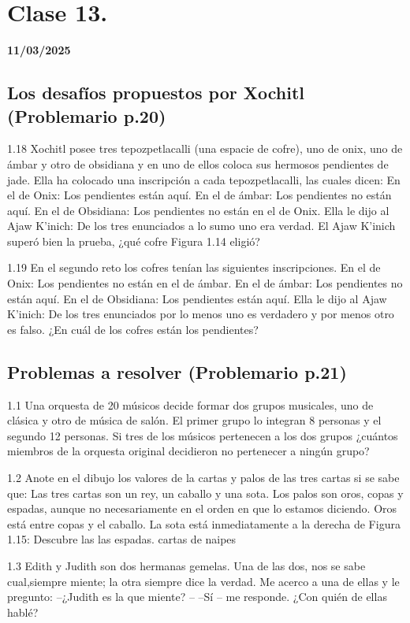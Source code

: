 \section{Clase 13.}
\textbf{11/03/2025}

\subsection{Los desafíos propuestos por Xochitl (Problemario p.20)}

1.18 Xochitl posee tres tepozpetlacalli (una espacie de cofre), uno de onix, uno de ámbar y otro de obsidiana y en uno de ellos coloca sus hermosos pendientes de jade. Ella ha colocado una inscripción a cada tepozpetlacalli, las cuales dicen: En el de Onix: Los pendientes están aquí. En el de ámbar: Los pendientes no están aquí. En el de Obsidiana: Los pendientes no están en el de Onix. Ella le dijo al Ajaw K’inich: De los tres enunciados a lo sumo uno era verdad. El Ajaw K’inich superó bien la prueba, ¿qué cofre Figura 1.14 eligió?

1.19 En el segundo reto los cofres tenían las siguientes inscripciones. En el de Onix: Los pendientes no están en el de ámbar. En el de ámbar: Los pendientes no están aquí. En el de Obsidiana: Los pendientes están aquí. Ella le dijo al Ajaw K’inich: De los tres enunciados por lo menos uno es verdadero y por menos otro es falso. ¿En cuál de los cofres están los pendientes?

\subsection{Problemas a resolver (Problemario p.21)}
1.1 Una orquesta de 20 músicos decide formar dos grupos musicales, uno de clásica y otro de música de salón. El primer grupo lo integran 8 personas y el segundo 12 personas. Si tres de los músicos pertenecen a los dos grupos ¿cuántos miembros de la orquesta original decidieron no pertenecer a ningún grupo?

1.2 Anote en el dibujo los valores de la cartas y palos de las tres cartas si se sabe que: Las tres cartas son un rey, un caballo y una sota. Los palos son oros, copas y espadas, aunque no necesariamente en el orden en que lo estamos diciendo. Oros está entre copas y el caballo. La sota está inmediatamente a la derecha de Figura 1.15: Descubre las las espadas. cartas de naipes

1.3 Edith y Judith son dos hermanas gemelas. Una de las dos, nos se sabe cual,siempre miente; la otra siempre dice la verdad. Me acerco a una de ellas y le pregunto: –¿Judith es la que miente? – –Sí – me responde. ¿Con quién de ellas hablé?

